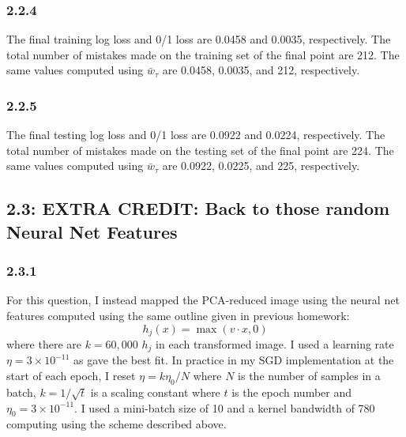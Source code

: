 \documentclass[12pt]{amsart}
\begin{document}
\subsubsection*{2.2.4}
The final training log loss and 0/1 loss are 0.0458 and 0.0035, respectively.  The total number of mistakes made on the training set of the final point are 212.  The same values computed using $\bar{w}_{\tau}$ are 0.0458, 0.0035, and 212, respectively.

\subsubsection*{2.2.5}
The final testing log loss and 0/1 loss are 0.0922 and 0.0224, respectively.  The total number of mistakes made on the testing set of the final point are 224.  The same values computed using $\bar{w}_{\tau}$ are 0.0922, 0.0225, and 225, respectively.

\subsection*{2.3: EXTRA CREDIT: Back to those random Neural Net Features}

\subsubsection*{2.3.1}

For this question, I instead mapped the PCA-reduced image using the neural net features computed using the same outline given in previous homework:
\begin{equation}
h_j(x) = \max(v \cdot x, 0)
\end{equation}
where there are $k = 60,000$ $h_j$ in each transformed image.  I used a learning rate $\eta = 3 \times 10^{-11}$ as gave the best fit.  In practice in my SGD implementation at the start of each epoch, I reset $\eta = k\eta_0/N$ where $N$ is the number of samples in a batch, $k = 1/\sqrt{t}$ is a scaling constant where $t$ is the epoch number and $\eta_0 = 3 \times 10^{-11}$.  I used a mini-batch size of 10 and a kernel bandwidth of 780 computing using the scheme described above. 
\end{document}
